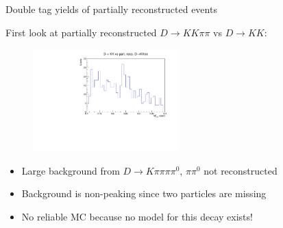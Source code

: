 \documentclass{beamer}
\begin{document}
\begin{frame}{Double tag yields of partially reconstructed events}
  \begin{center}
    First look at partially reconstructed $D\to KK\pi\pi$ vs $D\to KK$:
  \end{center}
  \vspace{-0.2cm}
  \begin{figure}
    \includegraphics[width = 0.5\textwidth]{Plots/KKPartReco_Mmiss2_NoCuts.pdf}
  \end{figure}
  \vspace{-0.3cm}
  \begin{itemize}
    \setlength\itemsep{0.5em}
    \item{Large background from $D\to K\pi\pi\pi\pi^0$, $\pi\pi^0$ not reconstructed}
    \item{Background is non-peaking since two particles are missing}
    \item{No reliable MC because no model for this decay exists!}
  \end{itemize}
\end{frame}
\end{document}
